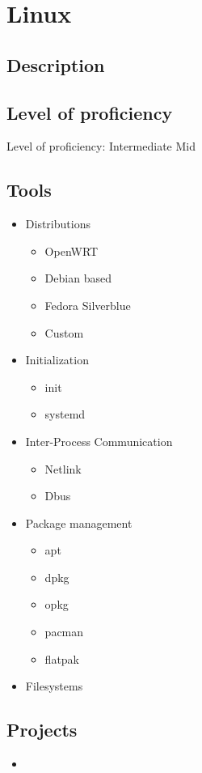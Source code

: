 \section{Linux}

\subsection{Description}

\subsection{Level of proficiency}

Level of proficiency: Intermediate Mid

\subsection{Tools}

\begin{itemize}
    \item Distributions
    \begin{itemize}
        \item OpenWRT
        \item Debian based
        \item Fedora Silverblue
        \item Custom
    \end{itemize}

    \item Initialization
    \begin{itemize}
        \item init
        \item systemd
    \end{itemize}

    \item Inter-Process Communication
    \begin{itemize}
        \item Netlink
        \item Dbus
    \end{itemize}

    \item Package management
    \begin{itemize}
        \item apt
        \item dpkg
        \item opkg
        \item pacman
        \item flatpak
    \end{itemize}

    \item Filesystems
    \begin{itemize}
    \end{itemize}

\end{itemize}

\subsection{Projects}

\begin{itemize}
    \item \noprojects
\end{itemize}

\newpage
